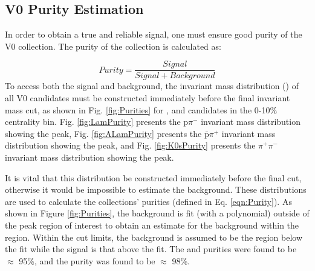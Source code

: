 \documentclass[/home/jesse/Analysis/Dissertation/ThesisBuxton.tex]{subfiles}
\begin{document}
\subsection{V0 Purity Estimation}
\label{V0PurEst}

In order to obtain a true and reliable signal, one must ensure good purity of the V0 collection.  The purity of the collection is calculated as:

\begin{equation}
 Purity = \frac{Signal}{Signal + Background}
\label{eqn:Purity}
\end{equation}
To access both the signal and background, the invariant mass distribution (\minv) of all V0 candidates must be constructed immediately before the final invariant mass cut, as shown in Fig. \ref{fig:Purities} for \Lam, \ALam and \Ks candidates in the 0-10\% centrality bin.
Fig. \ref{fig:LamPurity} presents the p$\pi^{-}$ invariant mass distribution showing the \Lam peak, Fig. \ref{fig:ALamPurity} presents the $\bar{\mathrm{p}}\pi^{+}$ invariant mass distribution showing the \ALam peak, and Fig. \ref{fig:K0sPurity} presents the $\pi^{+}\pi^{-}$ invariant mass distribution showing the \Ks peak.

It is vital that this distribution be constructed immediately before the final \minv cut, otherwise it would be impossible to estimate the background.
These distributions are used to calculate the collections' purities (defined in Eq. \ref{eqn:Purity}).
As shown in Figure \ref{fig:Purities}, the background is fit (with a polynomial) outside of the peak region of interest to obtain an estimate for the background within the region.
Within the \minv cut limits, the background is assumed to be the region below the fit while the signal is that above the fit.
The \Lam and \ALam purities were found to be $\approx$ 95\%, and the \Ks purity was found to be $\approx$ 98\%.
\end{document}
